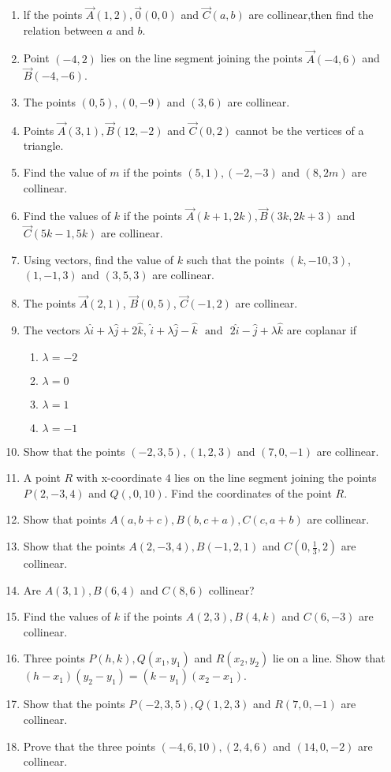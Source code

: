 \begin{enumerate}[label=\thesubsection.\arabic*,ref=\thesubsection.\theenumi]
\item lf the points $\vec{A}(1,2),\vec{0}(0,0)$ and $\vec{C}(a,b)$ are collinear,then find the relation between $a$ and $b$.
	\item Point $ (-4,2)$ lies on the line segment joining the points $ \vec{A}(-4,6)$  and  $\vec{B}(-4,-6)$.
 \item The points $(0,5),(0,-9)$ and $(3,6)$ are collinear.
\item Points $\vec{A}(3,1), \vec{B}(12,-2)$  and  $\vec {C}(0,2)$ cannot be the vertices of a triangle.
\item Find the value of $m$ if the points $(5,1),(-2,-3)$  and $(8,2m)$ are collinear.
\item Find the values of $k$ if the points $\vec{A}(k+1,2k),\vec{B}(3k,2k+3)$ and $\vec{C}(5k-1,5k)$ are collinear.
\item Using vectors, find the value of $k$ such that the points $(k,-10,3)$, $(1,-1,3)$  and  $(3,5,3)$ are collinear.
\item The points $\vec{A}(2,1)$, $\vec{B}(0,5)$, $\vec{C}(-1,2)$ are collinear.
\item The vectors $\lambda\hat{i}+\lambda\hat{j}+2\hat{k}$, $\hat{i}+\lambda\hat{j}-\hat{k}$ $\text{ and }$ $2\hat{i}-\hat{j}+\lambda\hat{k}$ are coplanar if
	\begin{enumerate}
\item	$\lambda=-2$
\item $\lambda=0$
\item $\lambda=1$
\item	$\lambda=-1$
\end{enumerate}
\item Show that the points $(-2,3,5), (1,2,3)$ and $(7,0,-1)$ are collinear.
\item A point $R$ with x-coordinate $4$ lies on the line segment joining the points $P(2,-3,4)$ and $Q(,0,10)$. Find the coordinates of the point $R$.
\item Show that points $A(a, b+c), B(b, c+a), C(c, a+b)$ are collinear.
\item Show that the points $A(2,-3,4), B(-1,2,1)$ and $C(0,\frac{1}{3},2)$ are collinear.
\item Are $A(3,1),B(6,4)$ and $C(8,6)$ collinear?
\item Find the values of $k$ if the points $A(2,3), B(4,k)$ and $C(6,-3)$ are collinear.
\item Three points $P(h,k), Q(x_1,y_1)$ and $R(x_2,y_2)$ lie on a line. Show that $(h-x_1)(y_2-y_1)=(k-y_1)(x_2-x_1)$.
\item Show that the points $P(-2,3,5), Q(1,2,3)$ and $R(7,0,-1)$ are collinear. 
\item Prove that the three points $(-4,6,10), (2,4,6)$ and $(14,0,-2)$ are collinear.
\end{enumerate}
